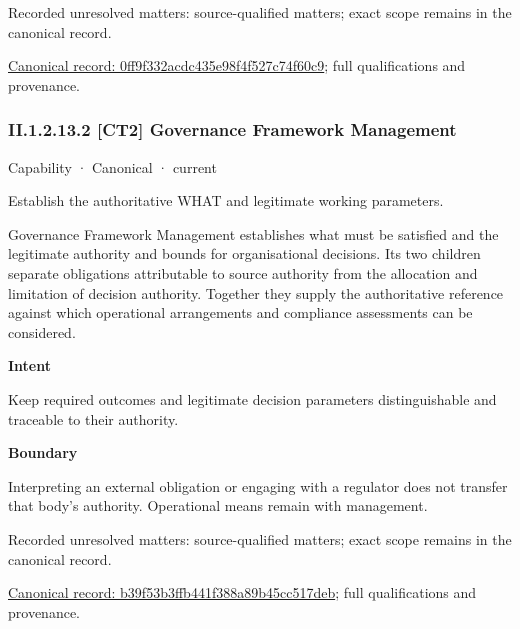 {\small Recorded unresolved matters: source-qualified matters; exact scope remains in the canonical record.}\par
{\footnotesize \href{../../../../continuum/strategy/capability/0ff9f332acdc435e98f4f527c74f60c9.md}{Canonical record: 0ff9f332acdc435e98f4f527c74f60c9}; full qualifications and provenance.}\par
\subsubsection*{II.1.2.13.2 [CT2] Governance Framework Management}
\label{navigation:II.1.2.13.2}

\label{element:b39f53b3ffb441f388a89b45cc517deb}
{\small Capability · Canonical · current}\par

Establish the authoritative WHAT and legitimate working parameters.



Governance Framework Management establishes what must be satisfied and the legitimate authority and bounds for organisational decisions. Its two children separate obligations attributable to source authority from the allocation and limitation of decision authority. Together they supply the authoritative reference against which operational arrangements and compliance assessments can be considered.



\textbf{Intent}



Keep required outcomes and legitimate decision parameters distinguishable and traceable to their authority.



\textbf{Boundary}



Interpreting an external obligation or engaging with a regulator does not transfer that body's authority. Operational means remain with management.


{\small Recorded unresolved matters: source-qualified matters; exact scope remains in the canonical record.}\par
{\footnotesize \href{../../../../continuum/strategy/capability/b39f53b3ffb441f388a89b45cc517deb.md}{Canonical record: b39f53b3ffb441f388a89b45cc517deb}; full qualifications and provenance.}\par

